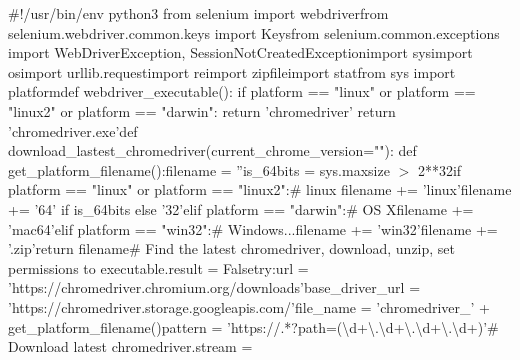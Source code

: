\documentclass[10pt]{article} %
\begin{document}
\begin{spacing}{1.5}
\noindent \#!/usr/bin/env python3\newline
from selenium import webdriver\newline from selenium.webdriver.common.keys import Keys\newline from selenium.common.exceptions import WebDriverException, SessionNotCreatedException\newline import sys\newline import os\newline import urllib.requestimport reimport zipfileimport stat\newline from sys import platform\newline def webdriver\_executable():    \newline if platform == "linux" or platform == "linux2" or platform == "darwin":        \newline return 'chromedriver'    \newline return 'chromedriver.exe'\newline def download\_lastest\_chromedriver(current\_chrome\_version=""):    \newline def get\_platform\_filename():\newline        filename = ''\newline        is\_64bits = sys.maxsize $\mathrm{>}$ 2**32\newline            if platform == "linux" or platform == "linux2":\newline            \# linux            filename += 'linux'\newline            filename += '64' if is\_64bits else '32'\newline        elif platform == "darwin":\newline            \# OS X\newline            filename += 'mac64'\newline        elif platform == "win32":\newline            \# Windows...\newline            filename += 'win32'\newline            filename += '.zip'\newline            return filename\newline        \# Find the latest chromedriver, download, unzip, set permissions to executable.\newline        result = False\newline    try:\newline        url = 'https://chromedriver.chromium.org/downloads'\newline        base\_driver\_url = 'https://chromedriver.storage.googleapis.com/'\newline        file\_name = 'chromedriver\_' + get\_platform\_filename()\newline        pattern = 'https://.*?path=({\textbackslash}d+{\textbackslash}.{\textbackslash}d+{\textbackslash}.{\textbackslash}d+{\textbackslash}.{\textbackslash}d+)'\newline            \# Download latest chromedriver.\newline        stream = 
\end{spacing}
\end{document}
